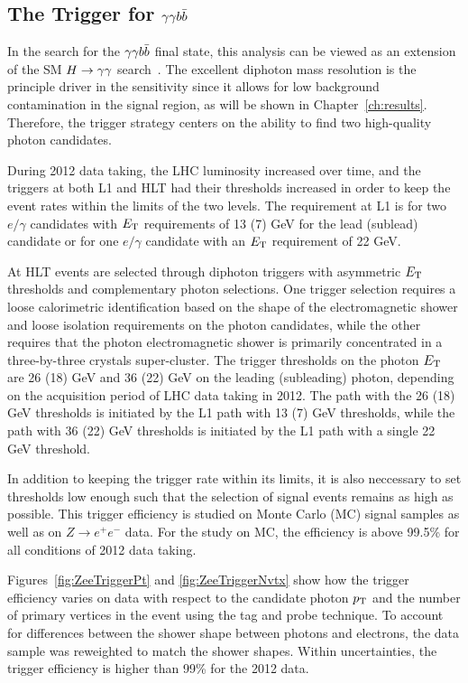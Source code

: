 \subsection{The Trigger for $\gamma\gamma b\bar{b}$}

In the search for the $\gamma\gamma b\bar{b}$ final state, this analysis can be viewed as an extension of the
SM $H\to\gamma\gamma$ search~\cite{HggCMSpaper}. The excellent diphoton mass
resolution is the principle driver in the sensitivity since it allows for low background contamination
in the signal region, as will be shown in Chapter~\ref{ch:results}.
Therefore, the trigger strategy centers on the ability to find two high-quality photon candidates.

During 2012 data taking, the LHC luminosity increased over time, and the triggers at both L1 and HLT
had their thresholds increased in order to keep the event rates within the limits of the two levels.
The requirement at L1 is for two $e/\gamma$ candidates with $E_{\rm T}$ requirements of 13 (7) GeV
for the lead (sublead) candidate or for one $e/\gamma$ candidate with an $E_{\rm T}$ requirement of
22 GeV.

At HLT events are selected through diphoton triggers with asymmetric $E_{\rm T}$ thresholds
and complementary photon selections. One trigger selection requires a loose calorimetric
identification based on the shape of the electromagnetic shower and loose isolation requirements
on the photon candidates, while the other requires that the photon electromagnetic shower
is primarily concentrated in a three-by-three crystals super-cluster.
The trigger thresholds on the photon $E_{\rm T}$ are 26 (18) GeV and 36 (22) GeV on the leading
(subleading) photon, depending on the acquisition period of LHC data taking in 2012.
The path with the 26 (18) GeV thresholds is initiated by the L1 path with 13 (7) GeV thresholds, while
the path with 36 (22) GeV thresholds is initiated by the L1 path with a single 22 GeV threshold.

In addition to keeping the trigger rate within its limits, it is also neccessary to set thresholds
low enough such that the selection of signal events remains as high as possible. This trigger efficiency
is studied on Monte Carlo (MC) signal samples as well as on $Z\rightarrow e^+ e^-$ data.
For the study on MC, the efficiency is above 99.5\% for all conditions of 2012 data taking.

Figures~\ref{fig:ZeeTriggerPt} and \ref{fig:ZeeTriggerNvtx}
show how the trigger efficiency varies on data with respect to the
candidate photon $p_{\rm T}$ and the number of primary vertices in the event
using the tag and probe technique. To account for differences
between the shower shape between photons and electrons, the data sample was reweighted to match the
shower shapes. Within uncertainties, the trigger efficiency is higher than 99\% for the 2012 data.

